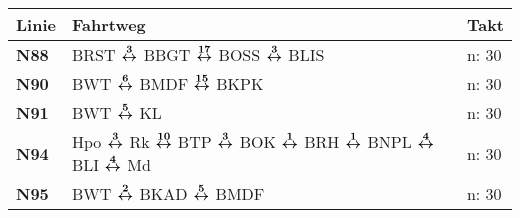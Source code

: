 \begin{minipage}[t]{0.45\textwidth}
\begin{tabular}{>{\bfseries}L{1.2cm}L{9.0cm}L{3.0cm}}
{\bfseries Linie} & {\bfseries Fahrtweg} & {\bfseries Takt} \\
\hline
\nbus{} N88   & BRST $\boldsymbol{\overset{3}{\leftrightarrow}}$ BBGT $\boldsymbol{\overset{17}{\leftrightarrow}}$ BOSS $\boldsymbol{\overset{3}{\leftrightarrow}}$ BLIS
& n: 30                      \\
\nbus{} N90   & BWT $\boldsymbol{\overset{6}{\leftrightarrow}}$ BMDF $\boldsymbol{\overset{15}{\leftrightarrow}}$ BKPK                                                                                                                              & n: 30                      \\
\nbus{} N91   & BWT $\boldsymbol{\overset{5}{\leftrightarrow}}$ KL                                                                                                                                                  & n: 30                      \\
\nbus{} N94   & Hpo $\boldsymbol{\overset{3}{\leftrightarrow}}$ Rk $\boldsymbol{\overset{10}{\leftrightarrow}}$ BTP $\boldsymbol{\overset{3}{\leftrightarrow}}$ BOK $\boldsymbol{\overset{1}{\leftrightarrow}}$ BRH $\boldsymbol{\overset{1}{\leftrightarrow}}$ BNPL $\boldsymbol{\overset{4}{\leftrightarrow}}$ BLI $\boldsymbol{\overset{4}{\leftrightarrow}}$ Md                                                 & n: 30                      \\
\nbus{} N95   & BWT $\boldsymbol{\overset{2}{\leftrightarrow}}$ BKAD $\boldsymbol{\overset{5}{\leftrightarrow}}$ BMDF                                                                                                                               & n: 30                      \\
\hline
\end{tabular}
\end{minipage}
\begin{minipage}[t]{0.05\textwidth}
\phantom{Tor}
\end{minipage}
\begin{minipage}[t]{0.05\textwidth}
\phantom{Tor}
\end{minipage}

